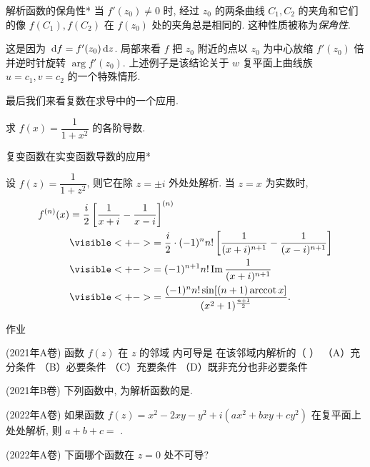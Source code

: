\begin{frame}{解析函数的保角性*}
\onslide<+->
当 $f'(z_0)\neq 0$ 时, 
\onslide<+->
经过 $z_0$ 的两条曲线 $C_1,C_2$ 的夹角和它们的像 $f(C_1),f(C_2)$ 在 $f(z_0)$ 处的夹角总是相同的.
\onslide<+->
这种性质被称为\emph{保角性}.

\onslide<+->
这是因为 $\,\mathrm{d} f=f'(z_0)\,\mathrm{d} z$.
\onslide<+->
局部来看 $f$ 把 $z_0$ 附近的点以 $z_0$ 为中心放缩 $f'(z_0)$ 倍并逆时针旋转 $\arg{f'(z_0)}$.
\onslide<+->
上述例子是该结论关于 $w$ 复平面上曲线族 $u=c_1,v=c_2$ 的一个特殊情形.

\onslide<+->
最后我们来看复数在求导中的一个应用.
\begin{example}
求 $f(x)=\dfrac1{1+x^2}$ 的各阶导数.
\end{example}
\end{frame}


\begin{frame}{复变函数在实变函数导数的应用*}
\begin{solution}
设 $f(z)=\dfrac1{1+z^2}$, 则它在除 $z=\pm i$ 外处处解析.
\onslide<+->
当 $z=x$ 为实数时,
\onslide<+->
\begin{align*}
f^{(n)}(x)&=\frac i2\left[\frac1{x+i}-\frac1{x-i}\right]^{(n)}\\
&\visible<+->{=\frac i2\cdot(-1)^n n!\left[\frac1{(x+i)^{n+1}}-\frac1{(x-i)^{n+1}}\right]}\\
&\visible<+->{=(-1)^{n+1}n!\Im\frac1{(x+i)^{n+1}}}\\
&\visible<+->{=\frac{(-1)^nn!\sin[(n+1)\arccot x]}{(x^2+1)^{\frac{n+1}2}}.}
\end{align*}
\end{solution}
\end{frame}


{
\homework
\begin{frame}[<*>]{作业}
  \begin{homeworks}
		\item(2021年A卷) 函数 $f(z)$ 在 $z$ 的邻域 内可导是 在该邻域内解析的（    ）
（A）充分条件        （B）必要条件     （C）充要条件        （D）既非充分也非必要条件

		\item(2021年B卷) 下列函数中, 为解析函数的是\fillbrace.
    \item(2022年A卷) 如果函数 $f(z)=x^2-2xy-y^2+i(ax^2+bxy+cy^2)$ 在复平面上处处解析, 则 $a+b+c=$ \fillblank{}.
    \item(2022年A卷) 下面哪个函数在 $z=0$ 处不可导?~\fillbrace
  \end{homeworks}
\end{frame}
}
